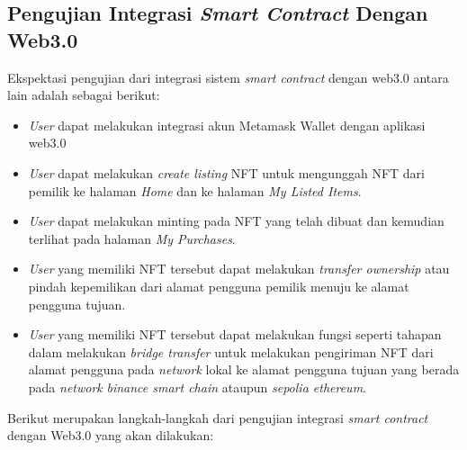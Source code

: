 \subsection{Pengujian Integrasi \emph{Smart Contract} Dengan Web3.0}
Ekspektasi pengujian dari integrasi sistem \emph{smart contract} dengan web3.0 antara lain adalah sebagai berikut:
\begin{itemize}
    \item \emph{User} dapat melakukan integrasi akun Metamask Wallet dengan aplikasi web3.0

    \item \emph{User} dapat melakukan \emph{create listing} NFT untuk mengunggah NFT dari pemilik ke halaman \emph{Home} dan ke halaman \emph{My Listed Items}.

    \item \emph{User} dapat melakukan minting pada NFT yang telah dibuat dan kemudian terlihat pada halaman \emph{My Purchases}.

    \item \emph{User} yang memiliki NFT tersebut dapat melakukan \emph{transfer ownership} atau pindah kepemilikan dari alamat pengguna pemilik menuju ke alamat pengguna tujuan.

    \item \emph{User} yang memiliki NFT tersebut dapat melakukan fungsi seperti tahapan dalam melakukan \emph{bridge transfer} untuk melakukan pengiriman NFT dari alamat pengguna pada \emph{network} lokal ke alamat pengguna tujuan yang berada pada \emph{network} \emph{binance smart chain} ataupun \emph{sepolia ethereum}. 
\end{itemize}

Berikut merupakan langkah-langkah dari pengujian integrasi \emph{smart contract} dengan Web3.0 yang akan dilakukan:

